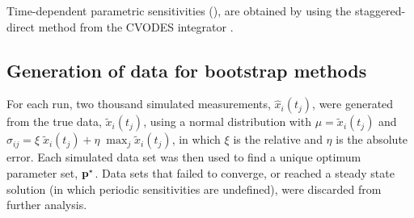 Time-dependent parametric sensitivities (), are obtained by using the staggered-direct method from the CVODES integrator \cite{Serban2005}. 

\subsection{Generation of data for bootstrap methods}
For each run, two thousand simulated measurements, $\hat{x}_i(t_j)$, were generated from the true data, $\tilde{x}_i(t_j)$, using a normal distribution with $\mu = \tilde{x}_i(t_j)$ and $\sigma_{ij} = \xi\;\tilde{x}_i(t_j) + \eta\;\max_j{\tilde{x}_i(t_j)}$, in which $\xi$ is the relative and $\eta$ is the absolute error. 
Each simulated data set was then used to find a unique optimum parameter set, ${\mathbf{p}}^\star$. 
Data sets that failed to converge, or reached a steady state solution (in which periodic sensitivities are undefined), were discarded from further analysis.

